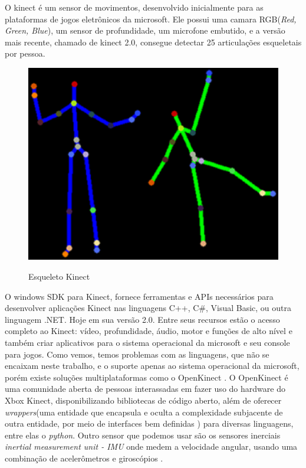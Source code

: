   O kinect é um sensor de movimentos, desenvolvido inicialmente para as plataformas
de jogos eletrônicos da microsoft. Ele possui uma camara RGB(\textit{Red, Green, Blue}),
um sensor de profundidade, um microfone embutido, e a versão mais recente, chamado de kinect 2.0, 
consegue detectar 25 articulações esqueletais por pessoa.

\begin{figure}[!h]                                                               
\centering                                                                         
\includegraphics [keepaspectratio=true,scale=0.60]{figuras/esqueletoKinect.eps}                                
\caption{Esqueleto Kinect}                                        
\cite{microsoftResearch}
\label{esqueletokinect}                                                        
\end{figure}                                                                    

  O windows SDK para Kinect, fornece ferramentas e APIs necessários para desenvolver
aplicações Kinect nas linguagens  C++, C\#, Visual Basic, ou outra linguagem .NET. Hoje em sua versão 2.0. Entre seus recursos estão o acesso completo ao Kinect: vídeo,
profundidade, áudio, motor e funções de alto nível e também  criar aplicativos 
para o sistema operacional da microsoft e seu console para jogos. Como vemos, 
temos problemas com as linguagens, que não se encaixam neste trabalho, e o suporte apenas ao sistema operacional da microsoft, porém
existe soluções multiplataformas como o OpenKinect \cite{openKinect}.
  O OpenKinect é uma comunidade aberta de pessoas interassadas em fazer uso do 
hardware do Xbox Kinect, disponibilizando bibliotecas de código aberto, além 
de oferecer \textit{wrappers}(uma entidade que encapsula e oculta a complexidade
 subjacente de outra entidade, por meio de interfaces bem definidas \cite{wrapper}) 
para diversas linguagens, entre elas o \textit{python}.
  Outro sensor que podemos usar são os sensores inerciais \textit{inertial 
measurement unit - IMU} onde medem a velocidade angular, usando uma combinação 
de acelerômetros e giroscópios \cite{imu}.

